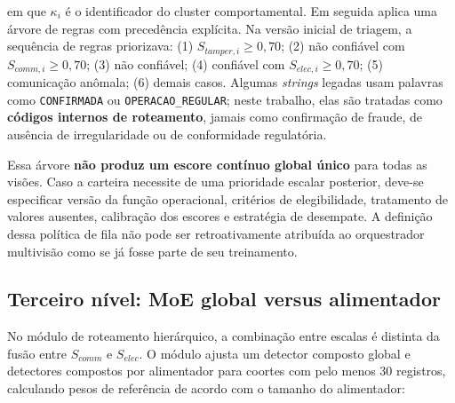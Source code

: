 em que \(\kappa_i\) é o identificador do cluster comportamental. Em seguida aplica uma árvore de regras com precedência explícita. Na versão inicial de triagem, a sequência de regras priorizava: (1) \(S_{tamper,i}\ge0{,}70\); (2) não confiável com \(S_{comm,i}\ge0{,}70\); (3) não confiável; (4) confiável com \(S_{elec,i}\ge0{,}70\); (5) comunicação anômala; (6) demais casos. Algumas \emph{strings} legadas usam palavras como \texttt{CONFIRMADA} ou \texttt{OPERACAO\_REGULAR}; neste trabalho, elas são tratadas como \textbf{códigos internos de roteamento}, jamais como confirmação de fraude, de ausência de irregularidade ou de conformidade regulatória.

Essa árvore \textbf{não produz um escore contínuo global único} para todas as visões. Caso a carteira necessite de uma prioridade escalar posterior, deve-se especificar versão da função operacional, critérios de elegibilidade, tratamento de valores ausentes, calibração dos escores e estratégia de desempate. A definição dessa política de fila não pode ser retroativamente atribuída ao orquestrador multivisão como se já fosse parte de seu treinamento.

\subsection{Terceiro nível: MoE global versus alimentador}\label{terceiro-nuxedvel-moe-global-versus-alimentador}

No módulo de roteamento hierárquico, a combinação entre escalas é distinta da fusão entre \(S_{comm}\) e \(S_{elec}\). O módulo ajusta um detector composto global e detectores compostos por alimentador para coortes com pelo menos 30 registros, calculando pesos de referência de acordo com o tamanho do alimentador:

